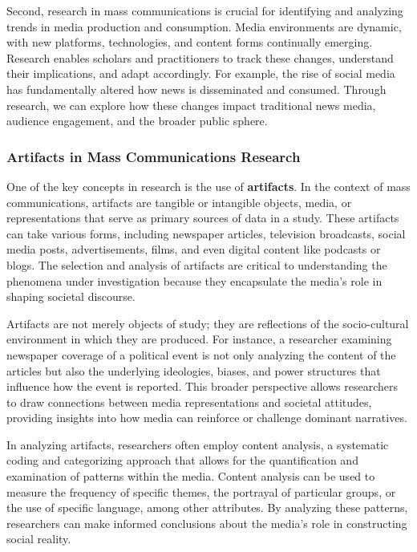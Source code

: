 \documentclass[
]{book}
\begin{document}
Second, research in mass communications is crucial for identifying and analyzing trends in media production and consumption. Media environments are dynamic, with new platforms, technologies, and content forms continually emerging. Research enables scholars and practitioners to track these changes, understand their implications, and adapt accordingly. For example, the rise of social media has fundamentally altered how news is disseminated and consumed. Through research, we can explore how these changes impact traditional news media, audience engagement, and the broader public sphere.

\subsubsection*{Artifacts in Mass Communications Research}\label{artifacts-in-mass-communications-research}

One of the key concepts in research is the use of \textbf{artifacts}. In the context of mass communications, artifacts are tangible or intangible objects, media, or representations that serve as primary sources of data in a study. These artifacts can take various forms, including newspaper articles, television broadcasts, social media posts, advertisements, films, and even digital content like podcasts or blogs. The selection and analysis of artifacts are critical to understanding the phenomena under investigation because they encapsulate the media's role in shaping societal discourse.

Artifacts are not merely objects of study; they are reflections of the socio-cultural environment in which they are produced. For instance, a researcher examining newspaper coverage of a political event is not only analyzing the content of the articles but also the underlying ideologies, biases, and power structures that influence how the event is reported. This broader perspective allows researchers to draw connections between media representations and societal attitudes, providing insights into how media can reinforce or challenge dominant narratives.

In analyzing artifacts, researchers often employ content analysis, a systematic coding and categorizing approach that allows for the quantification and examination of patterns within the media. Content analysis can be used to measure the frequency of specific themes, the portrayal of particular groups, or the use of specific language, among other attributes. By analyzing these patterns, researchers can make informed conclusions about the media's role in constructing social reality.
\end{document}
